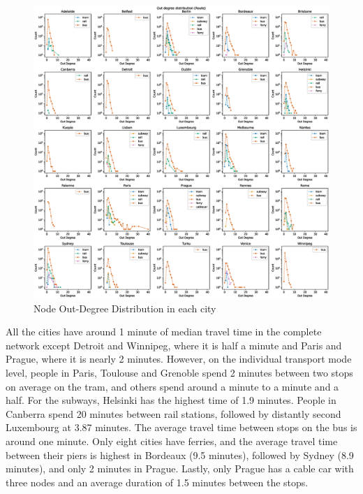 \documentclass{article}
\theoremstyle{plain}
\theoremstyle{definition}
\theoremstyle{remark}
\begin{document}
\begin{figure}[ht]
\vskip -0.1in
\begin{center}
\centerline{\includegraphics[width=\columnwidth]{images/out_deg_distribution.eps}}
\caption{Node Out-Degree Distribution in each city}
\label{out-deg}
\end{center}
\vskip -0.3in
\end{figure}

All the cities have around 1 minute of median travel time in the complete network except Detroit and Winnipeg, where it is half a minute and Paris and Prague, where it is nearly 2 minutes. However, on the individual transport mode level, people in Paris, Toulouse and Grenoble spend 2 minutes between two stops on average on the tram, and others spend around a minute to a minute and a half. For the subways, Helsinki has the highest time of 1.9 minutes. People in Canberra spend 20 minutes between rail stations, followed by distantly second Luxembourg at 3.87 minutes. The average travel time between stops on the bus is around one minute. Only eight cities have ferries, and the average travel time between their piers is highest in Bordeaux (9.5 minutes), followed by Sydney (8.9 minutes), and only 2 minutes in Prague. Lastly, only Prague has a cable car with three nodes and an average duration of 1.5 minutes between the stops.
\end{document}
